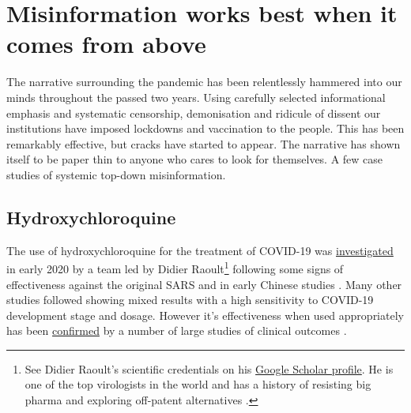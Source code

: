 \documentclass[11pt,a4paper,notitlepage]{report}
\begin{document}
\section*{Misinformation works best when it comes from above}

The narrative surrounding the pandemic has been relentlessly hammered into our minds throughout the passed two years. Using carefully selected informational emphasis and systematic censorship, demonisation and ridicule of dissent our institutions have imposed lockdowns and vaccination to the people. This has been remarkably effective, but cracks have started to appear. The narrative has shown itself to be paper thin to anyone who cares to look for themselves. A few case studies of systemic top-down misinformation.

\subsection*{Hydroxychloroquine}

The use of hydroxychloroquine for the treatment of COVID-19 was \href{https://pubmed.ncbi.nlm.nih.gov/32205204/}{investigated} in early 2020 by a team led by Didier Raoult\footnote{See Didier Raoult's scientific credentials on his \href{https://scholar.google.fr/citations?user=n8EF_6kAAAAJ&hl=fr}{Google Scholar profile}. He is one of the top virologists in the world and has a history of resisting big pharma and exploring off-patent alternatives \cite{doi:10.1177/1440783320936740}.} following some signs of effectiveness against the original SARS and in early Chinese studies \cite{Lagier2020-dw}. Many other studies followed showing mixed results with a high sensitivity to COVID-19 development stage and dosage. However it's effectiveness when used appropriately has been \href{https://www.ncbi.nlm.nih.gov/pmc/articles/PMC8023208/}{confirmed} by a number of large studies of clinical outcomes \cite{Mokhtari2021-ot}. 

\end{document}
